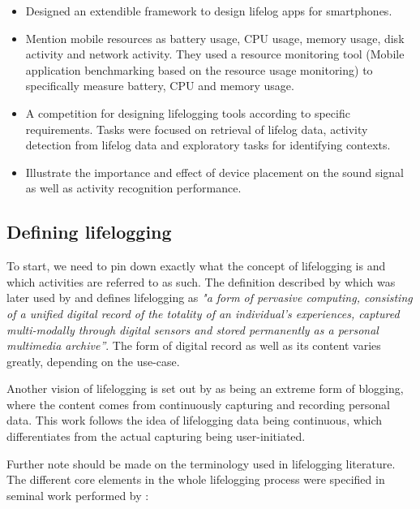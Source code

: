 \begin{itemize}
	\item \cite{rawassizadeh2013ubiqlog} Designed an extendible framework to design lifelog apps for smartphones. 
	\item \cite{rawassizadeh2013ubiqlog} Mention mobile resources as battery usage, CPU usage, memory usage, disk activity and network activity. They used a resource monitoring tool (Mobile application benchmarking based on the resource usage monitoring) to specifically measure battery, CPU and memory usage.
	\item \cite{gurrin2019overview} A competition for designing lifelogging tools according to specific requirements. Tasks were focused on retrieval of lifelog data, activity detection from lifelog data and exploratory tasks for identifying contexts.
	\item \cite{min2018exploring} Illustrate the importance and effect of device placement on the sound signal as well as activity recognition performance.
\end{itemize}

\subsection{Defining lifelogging}

To start, we need to pin down exactly what the concept of lifelogging is and which activities are referred to as such. The definition described by \citet{dodge2007outlines} which was later used by \citet{gurrin2014lifelogging} and \citet{harvey2016remembering} defines lifelogging as \textit{"a form of pervasive computing, consisting of a unified digital record of the totality of an individual’s experiences, captured multi-modally through digital sensors and stored permanently as a personal multimedia archive”}. The form of digital record as well as its content varies greatly, depending on the use-case. 

Another vision of lifelogging is set out by \citet{mears2016virtual} as being an extreme form of blogging, where the content comes from continuously capturing and recording personal data. This work follows the idea of lifelogging data being continuous, which differentiates from the actual capturing being user-initiated. 

Further note should be made on the terminology used in lifelogging literature. The different core elements in the whole lifelogging process were specified in seminal work performed by \citet{gurrin2014lifelogging}:

